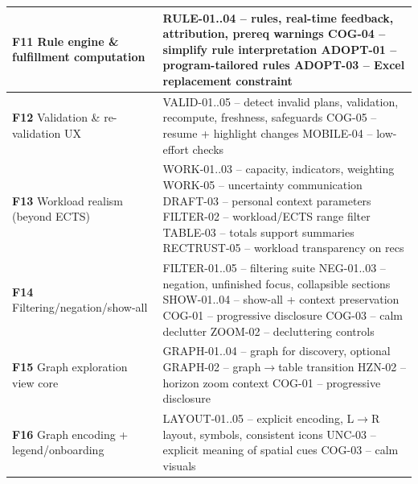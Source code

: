 \begin{longtable}{p{4.5cm} p{10cm}}
\textbf{F11} Rule engine \& fulfillment computation &
RULE-01..04 -- rules, real-time feedback, attribution, prereq warnings \newline
COG-04 -- simplify rule interpretation \newline
ADOPT-01 -- program-tailored rules \newline
ADOPT-03 -- Excel replacement constraint \\
\midrule

\textbf{F12} Validation \& re-validation UX &
VALID-01..05 -- detect invalid plans, validation, recompute, freshness, safeguards \newline
COG-05 -- resume + highlight changes \newline
MOBILE-04 -- low-effort checks \\
\midrule

\textbf{F13} Workload realism (beyond ECTS) &
WORK-01..03 -- capacity, indicators, weighting \newline
WORK-05 -- uncertainty communication \newline
DRAFT-03 -- personal context parameters \newline
FILTER-02 -- workload/ECTS range filter \newline
TABLE-03 -- totals support summaries \newline
RECTRUST-05 -- workload transparency on recs \\
\midrule

\textbf{F14} Filtering/negation/show-all &
FILTER-01..05 -- filtering suite \newline
NEG-01..03 -- negation, unfinished focus, collapsible sections \newline
SHOW-01..04 -- show-all + context preservation \newline
COG-01 -- progressive disclosure \newline
COG-03 -- calm declutter \newline
ZOOM-02 -- decluttering controls \\
\midrule

\textbf{F15} Graph exploration view core &
GRAPH-01..04 -- graph for discovery, optional \newline
GRAPH-02 -- graph$\rightarrow$table transition \newline
HZN-02 -- horizon zoom context \newline
COG-01 -- progressive disclosure \\
\midrule

\textbf{F16} Graph encoding + legend/onboarding &
LAYOUT-01..05 -- explicit encoding, L$\rightarrow$R layout, symbols, consistent icons \newline
UNC-03 -- explicit meaning of spatial cues \newline
COG-03 -- calm visuals \\
\midrule


\end{longtable}
